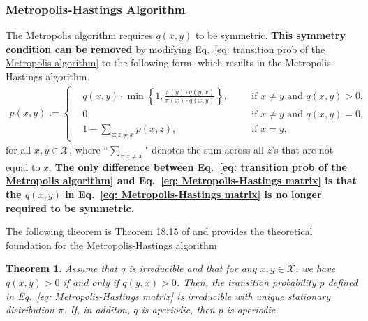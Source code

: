 \documentclass[11pt,letterpaper, leqno]{article}
\newtheorem{theorem}{Theorem}
\numberwithin{equation}{section}
\numberwithin{theorem}{section}
\numberwithin{lemma}{section}
\numberwithin{corollary}{section}
\numberwithin{definition}{section}
\numberwithin{proposition}{section}
\numberwithin{remark}{section}
\numberwithin{example}{section}
\begin{document}
\subsubsection{Metropolis-Hastings Algorithm}

The Metropolis algorithm requires $q(x,y)$ to be symmetric. \textbf{This symmetry condition can be removed} by modifying Eq.~\eqref{eq: transition prob of the Metropolis algorithm} to the following form, which results in the Metropolis-Hastings algorithm.
\begin{align}\label{eq: Metropolis-Hastings matrix}
    p(x,y):=\left\{
    \begin{aligned}
    & q(x,y)\cdot\min\left\{1, \frac{\pi(y)\cdot q(y,x)}{\pi(x)\cdot q(x,y)}\right\},\ \ &&\mbox{ if }x\ne y \mbox{ and }q(x,y)>0, \\
    & 0, \ \ &&\mbox{ if }x\ne y \mbox{ and }q(x,y)=0, \\
    & 1-\sum_{z:z\ne x} p(x,z), \ \ &&\mbox{ if }x=y,
    \end{aligned}
    \right.
\end{align}
for all $x,y\in\mathcal{X}$, where ``$\sum_{z:z\ne x}$" denotes the sum across all $z$'s that are not equal to $x$. \textbf{The only difference between Eq.~\eqref{eq: transition prob of the Metropolis algorithm} and Eq.~\eqref{eq: Metropolis-Hastings matrix} is that the $q(x,y)$ in Eq.~\eqref{eq: Metropolis-Hastings matrix} is no longer required to be symmetric.}

The following theorem is Theorem 18.15 of \cite{klenke2013probability} and provides the theoretical foundation for the Metropolis-Hastings algorithm
\begin{theorem}\label{thm: Theorem 18.15 of Klenke}
Assume that $q$ is irreducible and that for any $x,y\in\mathcal{X}$, we have $q(x,y)>0$ if and only if $q(y,x)>0$. Then, the transition probability $p$ defined in Eq.~\eqref{eq: Metropolis-Hastings matrix} is irreducible with unique stationary distribution $\pi$. If, in additon, $q$ is aperiodic, then $p$ is aperiodic.
\end{theorem}
\end{document}
